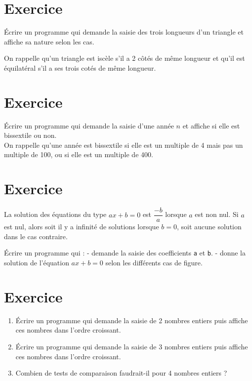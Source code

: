 \documentclass[11pt]{article}
\providecommand{\tightlist}{%
      \setlength{\itemsep}{0pt}\setlength{\parskip}{0pt}}
\begin{document}
    \hypertarget{exercice}{%
\section{Exercice}\label{exercice}}

Écrire un programme qui demande la saisie des trois longueurs d'un
triangle et affiche sa nature selon les cas.

On rappelle qu'un triangle est iscèle s'il a 2 côtés de même longueur et
qu'il est équilatéral s'il a ses trois cotés de même longueur.

    \hypertarget{exercice}{%
\section{Exercice}\label{exercice}}

Écrire un programme qui demande la saisie d'une année \(n\) et affiche
si elle est bissextile ou non.\\
On rappelle qu'une année est bissextile si elle est un multiple de 4
mais pas un multiple de 100, ou si elle est un multiple de 400.

    \hypertarget{exercice}{%
\section{Exercice}\label{exercice}}

La solution des équations du type \(ax+b=0\) est \(\dfrac{-b}{a}\)
lorsque \(a\) est non nul. Si \(a\) est nul, alors soit il y a infinité
de solutions lorsque \(b=0\), soit aucune solution dans le cas
contraire.

Écrire un programme qui : - demande la saisie des coefficients
\texttt{a} et \texttt{b}. - donne la solution de l'équation \(ax+b=0\)
selon les différents cas de figure.

    \hypertarget{exercice}{%
\section{Exercice}\label{exercice}}

\begin{enumerate}
\def\labelenumi{\arabic{enumi}.}
\tightlist
\item
  Écrire un programme qui demande la saisie de 2 nombres entiers puis
  affiche ces nombres dans l'ordre croissant.
\item
  Écrire un programme qui demande la saisie de 3 nombres entiers puis
  affiche ces nombres dans l'ordre croissant.
\item
  Combien de tests de comparaison faudrait-il pour 4 nombres entiers ?
\end{enumerate}
\end{document}
